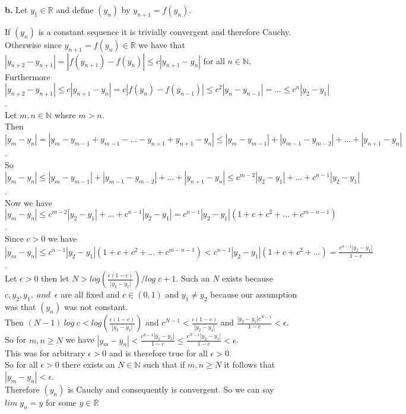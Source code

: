 \documentclass{article}
\begin{document}
{\Large\textbf{b.}} Let $y_1\in\mathbb{R}$ and define $(y_n)$ by $y_{n+1} = f(y_n)$.
\begin{center}
    \doublespacing
    If $(y_n)$ is a constant sequence it is trivially convergent and therefore Cauchy.
    \\Otherwise since $y_{n+1} = f(y_n)\in\mathbb{R}$ we have that $|y_{n+2} - y_{n+1}| = |f(y_{n+1}) - f(y_n)|\leq c|y_{n+1} - y_n|$ for all $n\in\mathbb{N}$.
    \\Furthermore $|y_{n+2} - y_{n+1}|\leq c|y_{n+1} - y_n| = c|f(y_n) - f(y_{n-1})|\leq c^2 |y_n - y_{n-1}| = ...\leq c^n |y_2 - y_1|$.
    \\Let $m, n\in\mathbb{N}$ where $m > n$.
    \\Then $|y_m - y_n| = |y_m - y_{m-1} + y_{m-1} - ... - y_{n+1} + y_{n+1} - y_n|\leq |y_m - y_{m-1}| + |y_{m-1} - y_{m-2}| + ... + |y_{n+1} - y_n|$.
    \\So $|y_m - y_n|\leq |y_m - y_{m-1}| + |y_{m-1} - y_{m-2}| + ... + |y_{n+1} - y_n|\leq c^{m-2} |y_2 - y_1| + ... + c^{n-1} |y_2 - y_1|$.
    \\Now we have $|y_m - y_n|\leq c^{m-2} |y_2 - y_1| + ... + c^{n-1} |y_2 - y_1| = c^{n-1} |y_2 - y_1| (1 + c + c^2 + ... + c^{m-n-1})$.
    \\Since $c > 0$ we have $|y_m - y_n|\leq c^{n-1} |y_2 - y_1| (1 + c + c^2 + ... + c^{m-n-1}) < c^{n-1} |y_2 - y_1| (1 + c + c^2 + ...) = \frac{c^{n-1} |y_2 - y_1|}{1 - c}$.
    \\Let $\epsilon > 0$ then let $N > log(\frac{\epsilon (1 - c)}{|y_2 - y_1|}) / log\;c + 1$. Such an $N$ exists because $c, y_2, y_1,\;and\;\:\epsilon$ are all fixed and $c\in (0, 1)$ and $y_1\neq y_2$ because our assumption was that $(y_n)$ was not constant.
    \\Then $(N - 1)\:log\;c < log(\frac{\epsilon (1 - c)}{|y_2 - y_1|})$ and $c^{N-1} < \frac{\epsilon (1 - c)}{|y_2 - y_1|}$ and $\frac{|y_2 - y_1| c^{N-1}}{1-c} <\epsilon$.
    \\So for $m, n\geq N$ we have $|y_m - y_n| < \frac{c^{n-1} |y_2 - y_1|}{1 - c}\leq \frac{c^{N-1} |y_2 - y_1|}{1 - c} <\epsilon$.
    \\This was for arbitrary $\epsilon > 0$ and is therefore true for all $\epsilon > 0$.
    \\So for all $\epsilon > 0$ there exists an $N\in\mathbb{N}$ such that if $m, n\geq N$ it follows that $|y_m - y_n| <\epsilon$.
    \\Therefore $(y_n)$ is Cauchy and consequently is convergent. So we can say $lim\; y_n = y$ for some $y\in\mathbb{R}$ \qedsymbol
\end{center}
\end{document}
